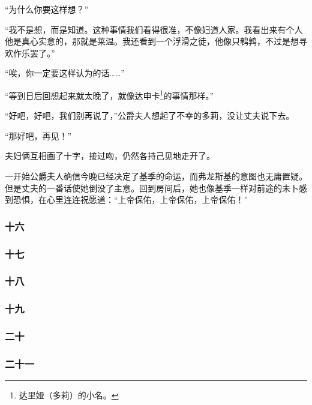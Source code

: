 \par “为什么你要这样想？”
\par “我不是想，而是知道。这种事情我们看得很准，不像妇道人家。我看出来有个人他是真心实意的，那就是莱温。我还看到一个浮滑之徒，他像只鹌鹑，不过是想寻欢作乐罢了。”
\par “唉，你一定要这样认为的话……”
\par “等到日后回想起来就太晚了，就像达申卡\footnote{达里娅（多莉）的小名。}的事情那样。”
\par “好吧，好吧，我们别再说了，”公爵夫人想起了不幸的多莉，没让丈夫说下去。
\par “那好吧，再见！”
\par 夫妇俩互相画了十字，接过吻，仍然各持己见地走开了。
\par 一开始公爵夫人确信今晚已经决定了基季的命运，而弗龙斯基的意图也无庸置疑。但是丈夫的一番话使她倒没了主意。回到房间后，她也像基季一样对前途的未卜感到恐惧，在心里连连祝愿道：“上帝保佑，上帝保佑，上帝保佑！”


\subsubsection*{十六}




\subsubsection*{十七}




\subsubsection*{十八}




\subsubsection*{十九}




\subsubsection*{二十}




\subsubsection*{二十一}




